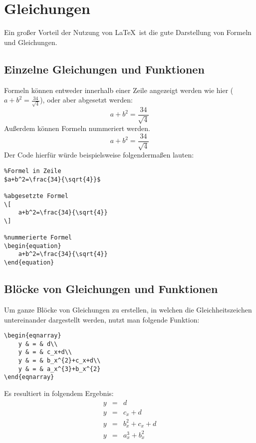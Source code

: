 \chapter{Gleichungen}
Ein großer Vorteil der Nutzung von \LaTeX\ ist die gute Darstellung von Formeln und Gleichungen. 
\section{Einzelne Gleichungen und Funktionen}
Formeln können entweder innerhalb einer Zeile angezeigt werden wie hier ($a+b^2=\frac{34}{\sqrt{4}}$), oder aber abgesetzt werden:
\[
    a+b^2=\frac{34}{\sqrt{4}}
\]
Außerdem können Formeln nummeriert werden.
\begin{equation}
    a+b^2=\frac{34}{\sqrt{4}}
\end{equation}
Der Code hierfür würde beispielsweise folgendermaßen lauten:
\begin{lstlisting}
%Formel in Zeile
$a+b^2=\frac{34}{\sqrt{4}}$

%abgesetzte Formel
\[
    a+b^2=\frac{34}{\sqrt{4}}
\]

%nummerierte Formel
\begin{equation}
    a+b^2=\frac{34}{\sqrt{4}}
\end{equation}
\end{lstlisting}

\section{Blöcke von Gleichungen und Funktionen}
Um ganze Blöcke von Gleichungen zu erstellen, in welchen die Gleichheitszeichen untereinander dargestellt werden, nutzt man folgende Funktion:

\begin{lstlisting}
\begin{eqnarray}
    y & = & d\\
    y & = & c_x+d\\
    y & = & b_x^{2}+c_x+d\\
    y & = & a_x^{3}+b_x^{2}
\end{eqnarray}
\end{lstlisting}
Es resultiert in folgendem Ergebnis:
\begin{eqnarray}
    y & = & d\\
    y & = & c_x+d\\
    y & = & b_x^{2}+c_x+d\\
    y & = & a_x^{3}+b_x^{2}
\end{eqnarray}

